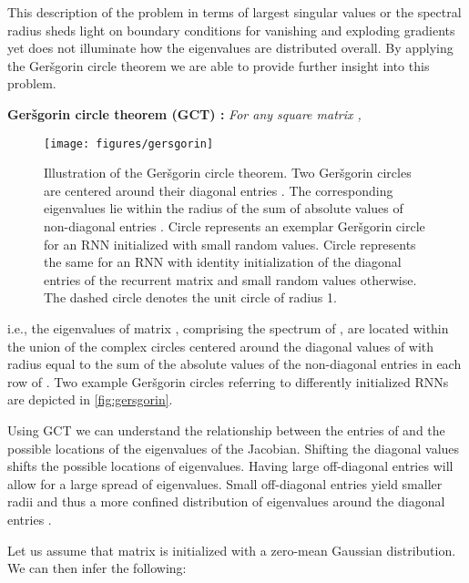 \documentclass[letterpaper]{article}
\def\gers{Ger\v{s}gorin}
\def\gct{GCT}
\begin{document}
This description of the problem in terms of largest singular values or the spectral radius sheds light on boundary conditions for vanishing and exploding gradients yet does not illuminate how the eigenvalues are distributed overall. By applying the \gers{} circle theorem we are able to provide further insight into this problem.

\textbf{\gers{} circle theorem (\gct{}) \citep{gersgorin}:}
\textit{For any square matrix ,}



\begin{figure}
\begin{center}
\texttt{[image: figures/gersgorin]}
\caption{Illustration of the \gers{} circle theorem. Two \gers{} circles are centered around their diagonal entries . The corresponding eigenvalues lie within the radius of the sum of absolute values of non-diagonal entries . Circle  represents an exemplar \gers{} circle for an RNN initialized with small random values. Circle  represents the same for an RNN with identity initialization of the diagonal entries of the recurrent matrix and small random values otherwise. The dashed circle denotes the unit circle of radius 1.}
\label{fig:gersgorin}
\end{center}
\end{figure}

i.e., the eigenvalues of matrix , comprising the spectrum of , are located within the union of the complex circles centered around the diagonal values  of  with radius  equal to the sum of the absolute values of the non-diagonal entries in each row of . Two example \gers{} circles referring to differently initialized RNNs are depicted in \autoref{fig:gersgorin}.

Using GCT we can understand the relationship between the entries of  and the possible locations of the eigenvalues of the Jacobian.
Shifting the diagonal values  shifts the possible locations of eigenvalues. 
Having large off-diagonal entries will allow for a large spread of eigenvalues. Small off-diagonal entries yield smaller radii and thus a more confined distribution of eigenvalues around the diagonal entries .

Let us assume that matrix  is initialized with a zero-mean Gaussian distribution. We can then infer the following:
\end{document}
